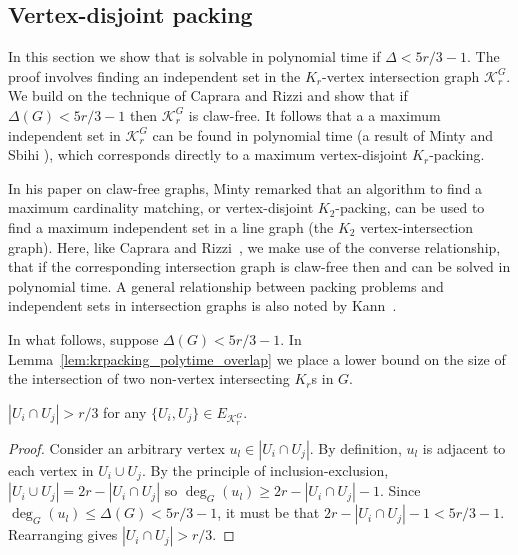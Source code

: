 \subsection{Vertex-disjoint packing} 
\label{sec:krpacking_vdkr_polytimesolvability}

In this section we show that \vdkr is solvable in polynomial time if $\Delta < 5r/3 - 1$. The proof involves finding an independent set in the $K_r$-vertex intersection graph $\mathcal{K}_r^G$. We build on the technique of Caprara and Rizzi \cite{caprara_packing_2002} and show that if $\Delta(G) < 5r/3 - 1$ then $\mathcal{K}_r^G$ is claw-free. It follows that a a maximum independent set in $\mathcal{K}_r^G$ can be found in polynomial time (a result of Minty \cite{MINTY1980284} and Sbihi \cite{SBIHI198053}), which corresponds directly to a maximum vertex-disjoint $K_r$-packing.

In his paper on claw-free graphs, Minty \cite{MINTY1980284} remarked that an algorithm to find a maximum cardinality matching, or vertex-disjoint $K_2$-packing, can be used to find a maximum independent set in a line graph (the $K_2$ vertex-intersection graph). Here, like Caprara and Rizzi~\cite{caprara_packing_2002}, we make use of the converse relationship, that if the corresponding intersection graph is claw-free then \vdkr and \edkr can be solved in polynomial time. A general relationship between packing problems and independent sets in intersection graphs is also noted by Kann~\cite{kann91}.

In what follows, suppose $\Delta(G) < {5r}/{3}-1$. In Lemma~\ref{lem:krpacking_polytime_overlap} we place a lower bound on the size of the intersection of two non-vertex intersecting $K_r$s in $G$.

\begin{lem}
\label{lem:krpacking_polytime_overlap}
$|U_i \cap U_j| > r/3$ for any $\{ U_i, U_j \} \in E_{\mathcal{K}_r^G}$.
\end{lem}
\begin{proof}
Consider an arbitrary vertex $u_l \in |U_i \cap U_j|$. By definition, $u_l$ is adjacent to each vertex in $U_i \cup U_j$. By the principle of inclusion-exclusion, $|U_i \cup U_j| = 2r - |U_i \cap U_j|$ so $\deg_{G}(u_l) \geq 2r - |U_i \cap U_j| - 1$. Since $\deg_{G}(u_l) \leq \Delta(G) < {5r}/{3}-1$, it must be that $2r - |U_i \cap U_j| - 1 < {5r}/{3}-1$. Rearranging gives $|U_i \cap U_j| > r/3$.
\end{proof}

